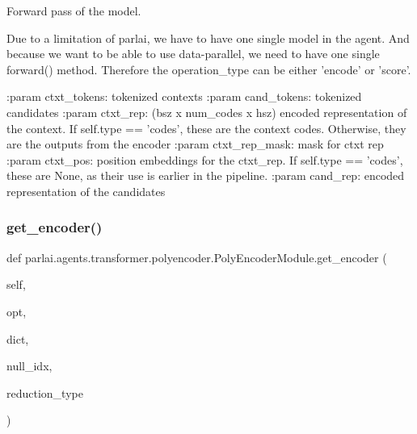 \begin{DoxyVerb}Forward pass of the model.

Due to a limitation of parlai, we have to have one single model
in the agent. And because we want to be able to use data-parallel,
we need to have one single forward() method.
Therefore the operation_type can be either 'encode' or 'score'.

:param ctxt_tokens:
    tokenized contexts
:param cand_tokens:
    tokenized candidates
:param ctxt_rep:
    (bsz x num_codes x hsz)
    encoded representation of the context. If self.type == 'codes', these
    are the context codes. Otherwise, they are the outputs from the
    encoder
:param ctxt_rep_mask:
    mask for ctxt rep
:param ctxt_pos:
    position embeddings for the ctxt_rep. If self.type == 'codes', these
    are None, as their use is earlier in the pipeline.
:param cand_rep:
    encoded representation of the candidates
\end{DoxyVerb}
 \mbox{\label{classparlai_1_1agents_1_1transformer_1_1polyencoder_1_1PolyEncoderModule_acd213717123d2f2f24e6f03270c3db14}} 
\subsubsection{\texorpdfstring{get\+\_\+encoder()}{get\_encoder()}}
{\footnotesize\ttfamily def parlai.\+agents.\+transformer.\+polyencoder.\+Poly\+Encoder\+Module.\+get\+\_\+encoder (\begin{DoxyParamCaption}\item[{}]{self,  }\item[{}]{opt,  }\item[{}]{dict,  }\item[{}]{null\+\_\+idx,  }\item[{}]{reduction\+\_\+type }\end{DoxyParamCaption})}

